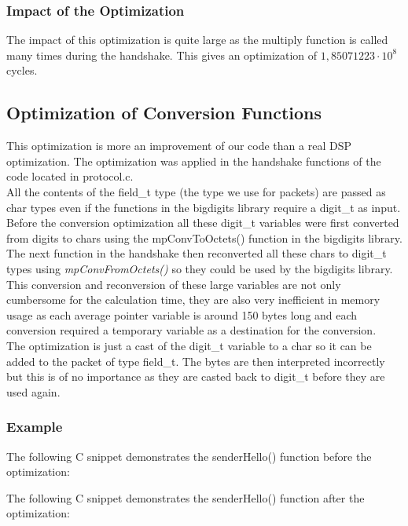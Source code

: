 \documentclass[a4paper]{article}
\begin{document}


\subsubsection{Impact of the Optimization}
The impact of this optimization is quite large as the multiply function is called many times during the handshake. This gives an optimization of $1,85071223\cdot10^{8}$ cycles.

\subsection{Optimization of Conversion Functions}
This optimization is more an improvement of our code than a real DSP optimization. The optimization was applied in the handshake functions of the code located in protocol.c.\\

All the contents of the field\_t type (the type we use for packets) are passed as char types even if the functions in the bigdigits library require a digit\_t as input. Before the conversion optimization all these digit\_t variables were first converted from digits to chars using the mpConvToOctets() function in the bigdigits library. The next function in the handshake then reconverted all these chars to digit\_t types using \textit{mpConvFromOctets()} so they could be used by the bigdigits library.\\

This conversion and reconversion of these large variables are not only cumbersome for the calculation time, they are also very inefficient in memory usage as each average pointer variable is around 150 bytes long and each conversion required a temporary variable as a destination for the conversion.\\

The optimization is just a cast of the digit\_t variable to a char so it can be added to the packet of type field\_t. The bytes are then interpreted incorrectly but this is of no importance as they are casted back to digit\_t before they are used again.\\

\subsubsection{Example}
The following C snippet demonstrates the senderHello() function before the optimization:

The following C snippet demonstrates the senderHello() function after the optimization:

\end{document}
